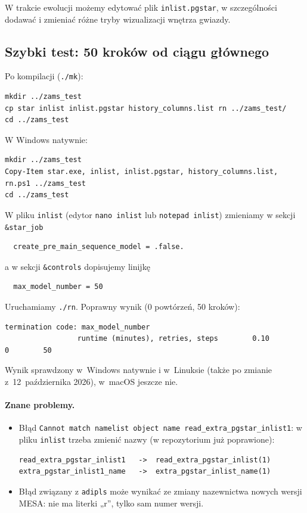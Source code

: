 \documentclass[11pt,a4paper]{article}
\begin{document}
W trakcie ewolucji możemy edytować plik \texttt{inlist.pgstar}, w szczególności dodawać i zmieniać różne tryby
wizualizacji wnętrza gwiazdy.






\subsection{Szybki test: 50 kroków od ciągu głównego}\label{sec:zams}

Po kompilacji (\verb!./mk!):
\begin{verbatim}
mkdir ../zams_test
cp star inlist inlist.pgstar history_columns.list rn ../zams_test/
cd ../zams_test
\end{verbatim}
W Windows natywnie:
\begin{small}
\begin{verbatim}
mkdir ../zams_test
Copy-Item star.exe, inlist, inlist.pgstar, history_columns.list, rn.ps1 ../zams_test
cd ../zams_test
\end{verbatim}
\end{small}
W pliku \texttt{inlist} (edytor \texttt{nano inlist} lub \texttt{notepad inlist}) zmieniamy w sekcji
\verb!&star_job!
\begin{verbatim}
  create_pre_main_sequence_model = .false.
\end{verbatim}
a w sekcji \verb!&controls! dopisujemy linijkę
\begin{verbatim}
  max_model_number = 50
\end{verbatim}
Uruchamiamy \verb!./rn!. Poprawny wynik (0 powtórzeń, 50 kroków):
\begin{verbatim}
termination code: max_model_number
                 runtime (minutes), retries, steps        0.10         0        50
\end{verbatim}
Wynik sprawdzony w~Windows natywnie i w~Linuksie (także po zmianie z~12~października 2026),
w~macOS jeszcze nie.


\paragraph{Znane problemy.}
\begin{itemize}
  \item Błąd \verb!Cannot match namelist object name read_extra_pgstar_inlist1!: w pliku
        \texttt{inlist} trzeba zmienić nazwy (w repozytorium już poprawione):
\begin{verbatim}
read_extra_pgstar_inlist1   ->  read_extra_pgstar_inlist(1)
extra_pgstar_inlist1_name   ->  extra_pgstar_inlist_name(1)
\end{verbatim}
  \item Błąd związany z \texttt{adipls} może wynikać ze zmiany nazewnictwa nowych wersji MESA: nie
        ma literki „r”, tylko sam numer wersji.
\end{itemize}
\end{document}
